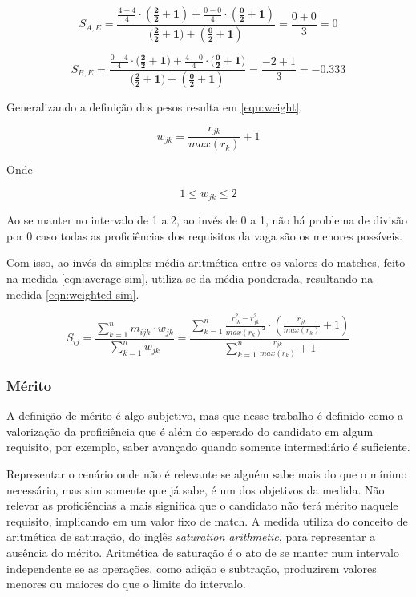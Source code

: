 \documentclass[preprint,12pt]{elsarticle}
\begin{document}
$$ S_{A,E} = \frac{\tfrac{4 - 4}{4} \cdot \boldsymbol{(\tfrac{2}{2} + 1)} + \tfrac{0 - 0}{4} \cdot \boldsymbol{(\tfrac{0}{2} + 1)}}{(\boldsymbol{\tfrac{2}{2} + 1)} + \boldsymbol{(\tfrac{0}{2} + 1)}} = \frac{0 + 0}{3} = 0 $$

$$ S_{B,E} = \frac{\tfrac{0 - 4}{4} \cdot (\boldsymbol{\tfrac{2}{2} + 1)} + \tfrac{4 - 0}{4} \cdot (\boldsymbol{\tfrac{0}{2} + 1)}}{(\boldsymbol{\tfrac{2}{2} + 1)} + \boldsymbol{(\tfrac{0}{2} + 1)}} = \frac{-2 + 1}{3} = -0.333 $$


Generalizando a definição dos pesos resulta em \ref{eqn:weight}. 

\begin{equation}
\label{eqn:weight}
    w_{jk} = \frac{r_{jk}}{max(r_k)} + 1
\end{equation}

Onde

\begin{equation}
1 \leq w_{jk} \leq 2
\end{equation}

Ao se manter no intervalo de 1 a 2, ao invés de 0 a 1, não há problema de divisão por 0 caso todas as proficiências dos requisitos da vaga são os menores possíveis.

Com isso, ao invés da simples média aritmética entre os valores do matches, feito na medida \ref{eqn:average-sim}, utiliza-se da média ponderada, resultando na medida \ref{eqn:weighted-sim}.  

\begin{equation}
\label{eqn:weighted-sim}
S_{ij} = \frac{\sum_{k=1}^n m_{ijk} \cdot w_{jk}}
              {\sum_{k=1}^n w_{jk}} = 
         \frac{\sum_{k=1}^n \frac{r_{ik}^2 - r_{jk}^2}{max(r_k)^2} \cdot (\frac{r_{jk}}{max(r_k)} + 1)}
              {\sum_{k=1}^n {\frac{r_{jk}}{max(r_k)} + 1}}
\end{equation}

\subsubsection{Mérito}
\label{sssec:merit}

A definição de mérito é algo subjetivo, mas que nesse trabalho é definido como a valorização da proficiência que é além do esperado do candidato em algum requisito, por exemplo, saber avançado quando somente intermediário é suficiente. 

Representar o cenário onde não é relevante se alguém sabe mais do que o mínimo necessário, mas sim somente que já sabe, é um dos objetivos da medida. Não relevar as proficiências a mais significa que o candidato não terá mérito naquele requisito, implicando em um valor fixo de match. A medida utiliza do conceito de  aritmética de saturação, do inglês \textit{saturation arithmetic}, para representar a ausência do mérito. Aritmética de saturação é o ato de se manter num intervalo independente se as operações, como adição e subtração, produzirem valores menores ou maiores do que o limite do intervalo.
\end{document}
